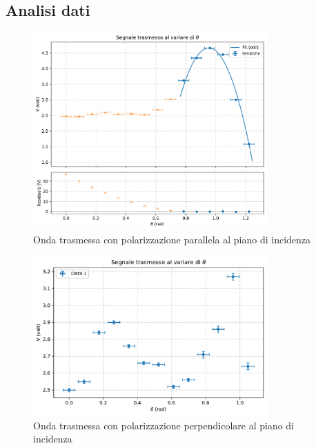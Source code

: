 \documentclass[a4paper]{article}
\begin{document}
\subsection{Analisi dati}
\begin{figure}[htbp]
	\centering
	\includegraphics[width=0.8\textwidth]{grafici/brewster.pdf}
	\caption{Onda trasmessa con polarizzazione parallela al piano di incidenza}
	\label{Brewster1}
\end{figure}
\begin{figure}[htbp]
	\centering
	\includegraphics[width=0.8\textwidth]{grafici/brewster1.pdf}
	\caption{Onda trasmessa con polarizzazione perpendicolare al piano di incidenza}
	\label{Brewster2}
\end{figure}
\end{document}
